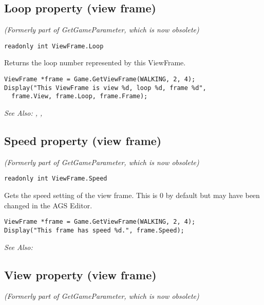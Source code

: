 \subsection{Loop property (view frame)}\label{ViewFrame.Loop}%

\it{(Formerly part of GetGameParameter, which is now obsolete)}

\begin{verbatim}
readonly int ViewFrame.Loop
\end{verbatim}
Returns the loop number represented by this ViewFrame.

\begin{verbatim}
ViewFrame *frame = Game.GetViewFrame(WALKING, 2, 4);
Display("This ViewFrame is view %d, loop %d, frame %d",
  frame.View, frame.Loop, frame.Frame);
\end{verbatim}

\it{See Also:} ,
,


\subsection{Speed property (view frame)}\label{ViewFrame.Speed}%

\it{(Formerly part of GetGameParameter, which is now obsolete)}

\begin{verbatim}
readonly int ViewFrame.Speed
\end{verbatim}
Gets the speed setting of the view frame. This is 0 by default but may have been changed
in the AGS Editor.

\begin{verbatim}
ViewFrame *frame = Game.GetViewFrame(WALKING, 2, 4);
Display("This frame has speed %d.", frame.Speed);
\end{verbatim}

\it{See Also:} 


\subsection{View property (view frame)}\label{ViewFrame.View}%

\it{(Formerly part of GetGameParameter, which is now obsolete)}

